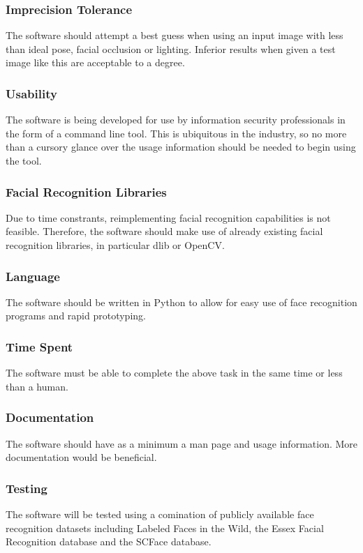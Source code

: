 \documentclass[12pt]{article}
\begin{document}
\subsubsection{Imprecision Tolerance}
The software should attempt a best guess when using an input image with less than ideal pose, facial occlusion or lighting. Inferior results when given a test image like this are acceptable to a degree.

\subsubsection{Usability}
The software is being developed for use by information security professionals in the form of a command line tool. This is ubiquitous in the industry, so no more than a cursory glance over the usage information should be needed to begin using the tool.

\subsubsection{Facial Recognition Libraries}
Due to time constrants, reimplementing facial recognition capabilities is not feasible. Therefore, the software should make use of already existing facial recognition libraries, in particular dlib or OpenCV.

\subsubsection{Language}
The software should be written in Python to allow for easy use of face recognition programs and rapid prototyping.

\subsubsection{Time Spent}
The software must be able to complete the above task in the same time or less than a human.

\subsubsection{Documentation}
The software should have as a minimum a man page and usage information. More documentation would be beneficial.

\subsubsection{Testing}
The software will be tested using a comination of publicly available face recognition datasets including Labeled Faces in the Wild, the Essex Facial Recognition database and the SCFace database.
\end{document}
